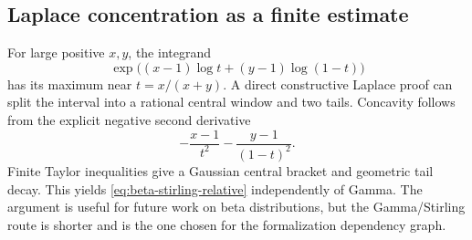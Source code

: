 \subsection{Laplace concentration as a finite estimate}

For large positive $x,y$, the integrand
\[
 \exp\!\bigl((x-1)\log t+(y-1)\log(1-t)\bigr)
\]
has its maximum near $t=x/(x+y)$.  A direct constructive Laplace proof can split the interval into a rational central window and two tails.  Concavity follows from the explicit negative second derivative
\[
 -\frac{x-1}{t^2}-\frac{y-1}{(1-t)^2}.
\]
Finite Taylor inequalities give a Gaussian central bracket and geometric tail decay.  This yields \eqref{eq:beta-stirling-relative} independently of Gamma.  The argument is useful for future work on beta distributions, but the Gamma/Stirling route is shorter and is the one chosen for the formalization dependency graph.
